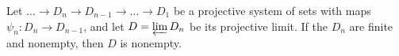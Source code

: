 Let $\ldots \rightarrow D_n \rightarrow D_{n-1} \rightarrow \ldots \rightarrow D_1$ be a projective system of sets with maps $\psi_n: D_n \rightarrow D_{n-1}$, and let $D = \varprojlim D_n$ be its projective limit. If the $D_n$ are finite and nonempty, then $D$ is nonempty.
